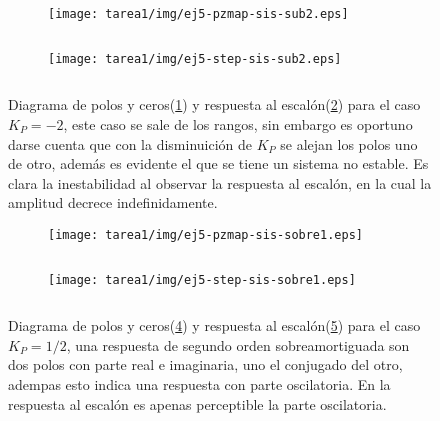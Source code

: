 \begin{ejercicio}
\begin{itemize}
    \begin{figure}[H]
      \centering
      \begin{subfigure}{0.48\textwidth}
        \centering
        \texttt{[image: tarea1/img/ej5-pzmap-sis-sub2.eps]}
        \caption{$\quad$}
        \label{ej5:img3:a}
      \end{subfigure}
      \begin{subfigure}{0.48\textwidth}
        \centering
        \texttt{[image: tarea1/img/ej5-step-sis-sub2.eps]}
        \caption{$\quad$}
        \label{ej5:img3:b}
      \end{subfigure}
      \caption{Diagrama de polos y ceros(\ref{ej5:img3:a}) y respuesta al escalón(\ref{ej5:img3:b}) para el caso $K_P = -2$, este caso se sale de los rangos, sin embargo es oportuno darse cuenta que con la disminuición de $K_P$ se alejan los polos uno de otro, además es evidente el que se tiene un sistema no estable. Es clara la inestabilidad al observar la respuesta al escalón, en la cual la amplitud decrece indefinidamente.}
      \label{ej5:img3}
    \end{figure}

    \begin{figure}[H]
      \centering
      \begin{subfigure}{0.48\textwidth}
        \centering
        \texttt{[image: tarea1/img/ej5-pzmap-sis-sobre1.eps]}
        \caption{$\quad$}
        \label{ej5:img4:a}
      \end{subfigure}
      \begin{subfigure}{0.48\textwidth}
        \centering
        \texttt{[image: tarea1/img/ej5-step-sis-sobre1.eps]}
        \caption{$\quad$}
        \label{ej5:img4:b}
      \end{subfigure}
      \caption{Diagrama de polos y ceros(\ref{ej5:img4:a}) y respuesta al escalón(\ref{ej5:img4:b}) para el caso $K_P = 1/2$, una respuesta de segundo orden sobreamortiguada son dos polos con parte real e imaginaria, uno el conjugado del otro, adempas esto indica una respuesta con parte oscilatoria. En la respuesta al escalón es apenas perceptible la parte oscilatoria.}
      \label{ej5:img4}
    \end{figure}


\end{itemize}
\end{ejercicio}
